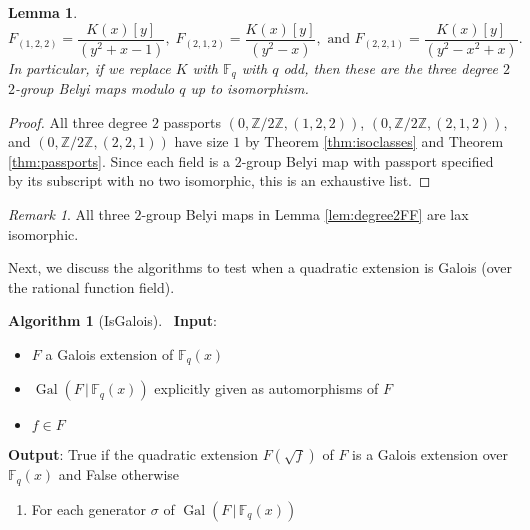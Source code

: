 \documentclass{dcthesis}
\newcommand{\ZZ}{\mathbb Z}
\newcommand{\FF}{\mathbb{F}}
\DeclareMathOperator{\Gal}{Gal}
\numberwithin{equation}{section}
\newtheorem{lemma}[equation]{Lemma}
\theoremstyle{definition}
\newtheorem{alg}[equation]{Algorithm}
\theoremstyle{remark}
\newtheorem{remark}[equation]{Remark}
\begin{document}
{{{\begin{lemma}
\begin{equation}
        \label{eqn:degree2FF}
        F_{(1,2,2)} =
        \frac{K(x)[y]}{(y^2 + x - 1)},\;
        F_{(2,1,2)} =
        \frac{K(x)[y]}{(y^2 - x)},
        \text{ and }
        F_{(2,2,1)} =
        \frac{K(x)[y]}{(y^2 - x^2 + x)}.
      \end{equation}
      In particular,
      if we replace $K$ with $\FF_q$ with $q$ odd,
      then these are the three degree $2$
      $2$-group Belyi maps
      modulo $q$ up to isomorphism.
    \end{lemma}
    \begin{proof}
      All three degree $2$ passports
      $(0,\ZZ/2\ZZ,(1,2,2))$,
      $(0,\ZZ/2\ZZ,(2,1,2))$, and
      \newline
      $(0,\ZZ/2\ZZ,(2,2,1))$
      have size $1$ by
      Theorem
      \ref{thm:isoclasses}
      and Theorem
      \ref{thm:passports}.
      Since each field is a
      $2$-group Belyi map
      with passport specified
      by its subscript
      with no two isomorphic,
      this is an exhaustive list.
    \end{proof}
    \begin{remark}
      \label{rmk:degree2FFlax}
      All three $2$-group Belyi maps
      in Lemma
      \ref{lem:degree2FF}
      are lax isomorphic.
    \end{remark}
    Next, we discuss the algorithms
    to test when a quadratic extension
    is Galois (over the rational function field).
    \begin{alg}[IsGalois]
      \label{alg:isgalois}
      \,
      \newline
      \textbf{Input}:
      \begin{itemize}
        \item
          $F$ a Galois extension of
          $\FF_q(x)$
        \item
          $\Gal(F\,|\,\FF_q(x))$
          explicitly given
          as automorphisms of $F$
        \item
          $f\in F$
      \end{itemize}
      \textbf{Output}:
      \textsf{True} if the quadratic extension
      $F(\sqrt{f})$ of $F$
      is a Galois extension over $\FF_q(x)$
      and \textsf{False} otherwise
      \begin{enumerate}
        \item
          For each generator
          $\sigma$ of $\Gal(F\,|\,\FF_q(x))$

\end{enumerate}
\end{alg}}}}
\end{document}
